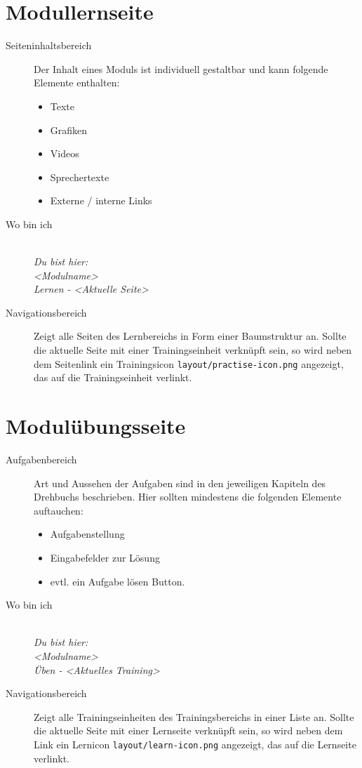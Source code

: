 %
%
%
\section{Modullernseite}
\label{sec:hauptseite}

\begin{description}
  \item[Seiteninhaltsbereich] Der Inhalt eines Moduls ist individuell gestaltbar und kann folgende Elemente enthalten:
  \begin{itemize}
    \item Texte
    \item Grafiken
    \item Videos
    \item Sprechertexte
    \item Externe / interne Links
  \end{itemize}
  
  \item[Wo bin ich] \emph{\\Du bist hier:\\<Modulname>\\Lernen - <Aktuelle Seite>}
  \item[Navigationsbereich] Zeigt alle Seiten des Lernbereichs in Form einer Baumstruktur an. Sollte die aktuelle Seite mit einer Trainingseinheit verknüpft sein, so wird neben dem Seitenlink ein Trainingsicon \texttt{layout/practise-icon.png} angezeigt, das auf die Trainingseinheit verlinkt.
  
\end{description}


%
%
%
\section{Modulübungsseite}
\label{sec:module-training-page}

\begin{description}
  \item[Aufgabenbereich] Art und Aussehen der Aufgaben sind in den jeweiligen Kapiteln des Drehbuchs beschrieben. Hier sollten mindestens die folgenden Elemente auftauchen:
  \begin{itemize}
    \item Aufgabenstellung
    \item Eingabefelder zur Lösung
    \item evtl. ein Aufgabe lösen Button.
  \end{itemize}
  \item[Wo bin ich] \emph{\\Du bist hier:\\<Modulname>\\Üben - <Aktuelles Training>}
  \item[Navigationsbereich] Zeigt alle Trainingseinheiten des Trainingsbereichs in einer Liste an. 
	Sollte die aktuelle Seite mit einer Lernseite verknüpft sein, so wird neben dem Link ein Lernicon \texttt{layout/learn-icon.png} angezeigt, das auf die Lernseite verlinkt.
\end{description}



\endinput 
